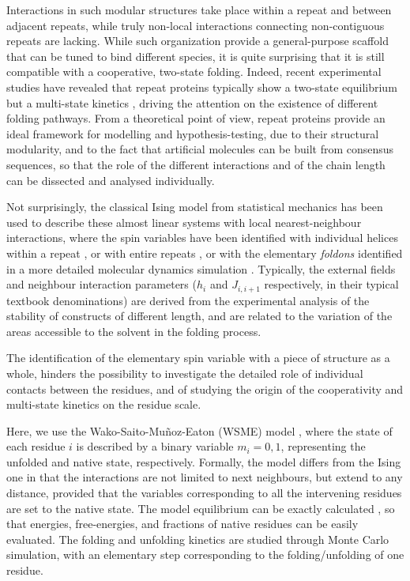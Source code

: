Interactions in such modular structures take place within a repeat 
and between adjacent repeats, while truly non-local interactions connecting 
non-contiguous repeats are lacking. While such organization provide a 
general-purpose scaffold that can be tuned to bind different species, 
it is quite surprising that it is still compatible with a cooperative, 
two-state folding. 
Indeed, recent experimental studies have revealed that repeat proteins 
typically show a two-state equilibrium but a multi-state kinetics \cite{Kloss2008}, 
driving the attention on the existence of different folding pathways. 
From a theoretical point of view, repeat proteins provide an ideal 
framework for modelling and hypothesis-testing, due to their structural 
modularity, and to the fact that artificial molecules can be built 
from consensus sequences, so that the role of the different interactions 
and of the chain length can be dissected and analysed individually.

Not surprisingly, the classical  Ising model from statistical mechanics 
has been used to  describe these almost linear systems with local 
nearest-neighbour interactions, where the spin variables have been 
identified with individual helices within a repeat \cite{Kaj2005}, 
or with entire repeats \cite{Wetzel2008}, or with the elementary 
\emph{foldons} identified in a more detailed molecular dynamics simulation 
\cite{Ferreiro2008}. Typically, the external fields and neighbour 
interaction parameters ($h_i$ and $J_{i,i+1}$ respectively, in their 
typical textbook denominations) are derived from the experimental analysis 
of the stability of constructs
of different length, and are related to the variation of the areas accessible 
to the solvent in the folding process.

The identification of the elementary spin variable with a piece of structure 
as a whole, hinders the possibility to investigate the detailed 
role of individual contacts between the residues, and of studying the origin 
of the cooperativity and multi-state kinetics on the residue scale. 

Here, we use the Wako-Saito-Mu{\~n}oz-Eaton (WSME) model 
\cite{Wako1978a,Wako1978b,Munoz1998,Munoz1997,Munoz1999}, 
where the state of each residue $i$ is described by a binary variable 
$m_i=0,1$, representing the unfolded and native state, respectively. 
Formally, the model differs from the Ising one in that the interactions 
are not limited to next neighbours, but extend to any distance, provided 
that the variables corresponding to all the intervening residues are set 
to the native state. The model equilibrium can be exactly calculated 
\cite{Wako1978a,Wako1978b,Bruscolini2002,Pelizzola2005}, so that energies, 
free-energies, and fractions of native residues can be easily evaluated.
The folding and unfolding kinetics are studied through Monte Carlo simulation, 
with an elementary step corresponding to the folding/unfolding of one residue. 

